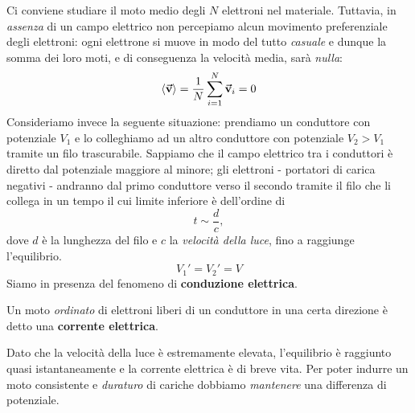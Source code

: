 Ci conviene studiare il moto medio degli $N$ elettroni nel materiale. Tuttavia, in \textit{assenza} di un campo elettrico non percepiamo alcun movimento preferenziale degli elettroni: ogni elettrone si muove in modo del tutto \textit{casuale} e dunque la somma dei loro moti, e di conseguenza la velocità media, sarà \textit{nulla}:
\begin{equation}
	\left<\vb*{\va{v}}\right>=\frac{1}{N}\sum_{i=1}^{N}\vb*{\va{v}}_i=0
\end{equation}
Consideriamo invece la seguente situazione: prendiamo un conduttore con potenziale $V_1$ e lo colleghiamo ad un altro conduttore con potenziale $V_2>V_1$ tramite un filo trascurabile. Sappiamo che il campo elettrico tra i conduttori è diretto dal potenziale maggiore al minore; gli elettroni - portatori di carica negativi - andranno dal primo conduttore verso il secondo tramite il filo che li collega in un tempo il cui limite inferiore è dell'ordine di
\begin{equation*}
	t\sim\frac{d}{c},
\end{equation*}
dove $d$ è la lunghezza del filo e $c$ la \textit{velocità della luce}, fino a raggiunge l'equilibrio.
\begin{equation*}
	V_1'=V_2'=V
\end{equation*}
Siamo in presenza del fenomeno di \textbf{conduzione elettrica}.
\begin{define}
	Un moto \textit{ordinato} di elettroni liberi di un conduttore in una certa direzione è detto una \textbf{corrente elettrica}.
\end{define}
Dato che la velocità della luce è estremamente elevata, l'equilibrio è raggiunto quasi istantaneamente e la corrente elettrica è di breve vita. Per poter indurre un moto consistente e \textit{duraturo} di cariche dobbiamo \textit{mantenere} una differenza di potenziale.

